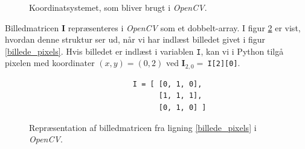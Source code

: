 {\begin{figure}[!b]
\begin{picture}
    \end{picture}
    \caption[]{Koordinatsystemet, som bliver brugt i \emph{OpenCV}.}
    \label{opencv_koordinatsystem}
\end{figure}

Billedmatricen $\mathbf{I}$ repræsenteres i \emph{OpenCV} som et
dobbelt-array. I figur \ref{opencv_billedematrix} er vist, hvordan denne
struktur ser ud, når vi har indlæst billedet givet i figur
\ref{billede_pixels}. Hvis billedet er indlæst i variablen \texttt{I},
kan vi i Python tilgå pixelen med koordinater $(x,y) = (0,2)$ ved
$\textbf{I}_{2,0} =~$\texttt{I[2][0]}.

\begin{figure}[t]
    \begin{verbatim}
                        I = [ [0, 1, 0],
                              [1, 1, 1],
                              [0, 1, 0] ]
    \end{verbatim}
\vspace{-2em}
\caption{Repræsentation af billedmatricen fra ligning
\ref{billede_pixels} i \emph{OpenCV}.}
\label{opencv_billedematrix}
\end{figure}

}
